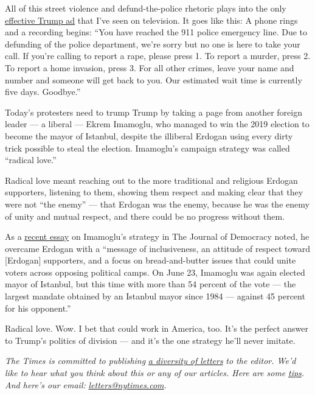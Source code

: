 All of this street violence and defund-the-police rhetoric plays into
the only
\href{https://www.nytimes.com/2020/07/21/us/politics/trump-portland-federal-agents.html}{effective
Trump ad} that I've seen on television. It goes like this: A phone rings
and a recording begins: ``You have reached the 911 police emergency
line. Due to defunding of the police department, we're sorry but no one
is here to take your call. If you're calling to report a rape, please
press 1. To report a murder, press 2. To report a home invasion, press
3. For all other crimes, leave your name and number and someone will get
back to you. Our estimated wait time is currently five days. Goodbye.''

Today's protesters need to trump Trump by taking a page from another
foreign leader --- a liberal --- Ekrem Imamoglu, who managed to win the
2019 election to become the mayor of Istanbul, despite the illiberal
Erdogan using every dirty trick possible to steal the election.
Imamoglu's campaign strategy was called ``radical love.''

Radical love meant reaching out to the more traditional and religious
Erdogan supporters, listening to them, showing them respect and making
clear that they were not ``the enemy'' --- that Erdogan was the enemy,
because he was the enemy of unity and mutual respect, and there could be
no progress without them.

As a
\href{https://www.journalofdemocracy.org/articles/the-pushback-against-populism-running-on-radical-love-in-turkey/}{recent
essay} on Imamoglu's strategy in The Journal of Democracy noted, he
overcame Erdogan with a ``message of inclusiveness, an attitude of
respect toward {[}Erdogan{]} supporters, and a focus on bread-and-butter
issues that could unite voters across opposing political camps. On June
23, Imamoglu was again elected mayor of Istanbul, but this time with
more than 54 percent of the vote --- the largest mandate obtained by an
Istanbul mayor since 1984 --- against 45 percent for his opponent.''

Radical love. Wow. I bet that could work in America, too. It's the
perfect answer to Trump's politics of division --- and it's the one
strategy he'll never imitate.

\emph{The Times is committed to publishing}
\href{https://www.nytimes.com/2019/01/31/opinion/letters/letters-to-editor-new-york-times-women.html}{\emph{a
diversity of letters}} \emph{to the editor. We'd like to hear what you
think about this or any of our articles. Here are some}
\href{https://help.nytimes.com/hc/en-us/articles/115014925288-How-to-submit-a-letter-to-the-editor}{\emph{tips}}\emph{.
And here's our email:}
\href{mailto:letters@nytimes.com}{\emph{letters@nytimes.com}}\emph{.}

